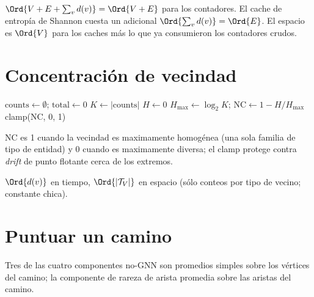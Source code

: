 \begin{complexity}
$\Ord{V + E + \sum_v d(v)} = \Ord{V + E}$ para los contadores. El
cache de entropía de Shannon cuesta un adicional
$\Ord{\sum_v d(v)} = \Ord{E}$. El espacio es $\Ord{V}$ para los
caches más lo que ya consumieron los contadores crudos.
\end{complexity}

\section{Concentración de vecindad}

\begin{algorithm}
\caption{\textsc{Compute-NC}}\label{alg:compute-nc}
$\mathrm{counts} \gets \emptyset$; $\mathrm{total} \gets 0$\;
$K \gets |\mathrm{counts}|$\;
$H \gets 0$\;
$H_{\max} \gets \log_2 K$; $\mathrm{NC} \gets 1 - H / H_{\max}$\;
\Return clamp($\mathrm{NC}$, 0, 1)\;
\end{algorithm}

$\mathrm{NC}$ es 1 cuando la vecindad es maximamente homogénea
(una sola familia de tipo de entidad) y 0 cuando es maximamente
diversa; el clamp protege contra \emph{drift} de punto flotante
cerca de los extremos.

\begin{complexity}
$\Ord{d(v)}$ en tiempo, $\Ord{|\mathcal{T}_V|}$ en espacio (sólo
conteos por tipo de vecino; constante chica).
\end{complexity}

\section{Puntuar un camino}

Tres de las cuatro componentes no-GNN son promedios simples sobre
los vértices del camino; la componente de rareza de arista
promedia sobre las aristas del camino.

